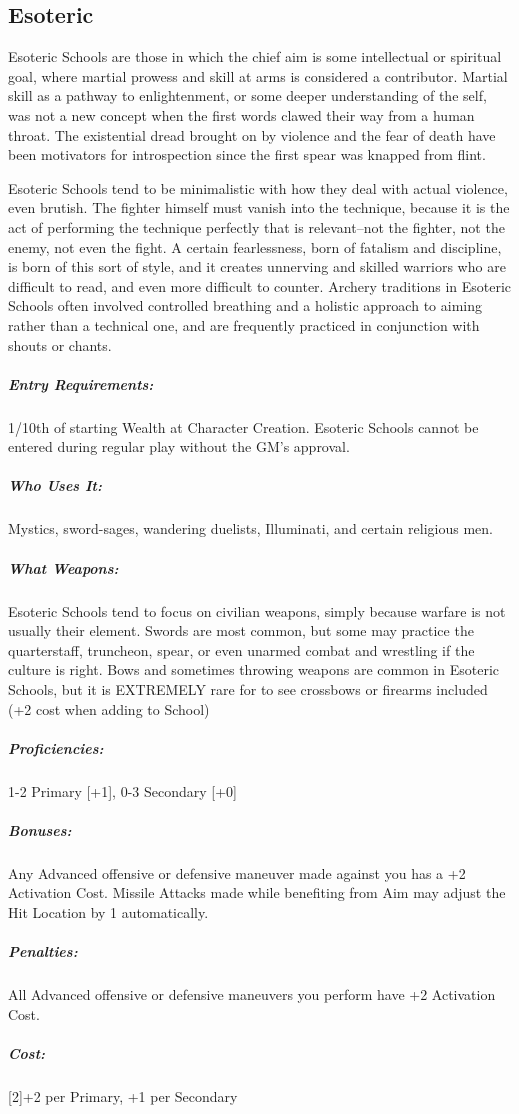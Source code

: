 \documentclass[oneside,11pt,english]{book}
\begin{document}
\subsection{Esoteric}
Esoteric Schools are those in which the chief aim is some intellectual or spiritual goal, where martial 
prowess and skill at arms is considered a contributor. Martial skill as a pathway to enlightenment, or some 
deeper understanding of the self, was not a new concept when the first words clawed their way from a 
human throat. The existential dread brought on by violence and the fear of death have been motivators for 
introspection since the first spear was knapped from flint. 

Esoteric Schools tend to be minimalistic with how they deal with actual violence, even brutish. The 
fighter himself must vanish into the technique, because it is the act of performing the technique perfectly 
that is relevant--not the fighter, not the enemy, not even the fight. A certain fearlessness, born of fatalism 
and discipline, is born of this sort of style, and it creates unnerving and skilled warriors who are difficult 
to read, and even more difficult to counter. Archery traditions in Esoteric Schools often involved 
controlled breathing and a holistic approach to aiming rather than a technical one, and are frequently 
practiced in conjunction with shouts or chants. 
\vspace{-15pt}\subparagraph{Entry Requirements:} 1/10th of starting Wealth at Character Creation. Esoteric Schools cannot be entered during regular play without the GM’s approval.
\vspace{-15pt}\subparagraph{Who Uses It:} Mystics, sword-sages, wandering duelists, Illuminati, and certain religious men. 
\vspace{-15pt}\subparagraph{What Weapons:} Esoteric Schools tend to focus on civilian weapons, simply because warfare is not 
usually their element. Swords are most common, but some may practice the quarterstaff, truncheon, spear, or even unarmed combat and wrestling if the culture is right. Bows and sometimes throwing weapons are 
common in Esoteric Schools, but it is EXTREMELY rare for to see crossbows or firearms included (+2 
cost when adding to School) 
\vspace{-15pt}\subparagraph{Proficiencies:} 1-2 Primary [+1], 0-3 Secondary [+0] 
\vspace{-15pt}\subparagraph{Bonuses:} Any Advanced offensive or defensive maneuver made against you has a +2 Activation Cost. 
Missile Attacks made while benefiting from Aim may adjust the Hit Location by 1 automatically. 
\vspace{-15pt}\subparagraph{Penalties:} All Advanced offensive or defensive maneuvers you perform have +2 Activation Cost. 
\vspace{-15pt}\subparagraph{Cost:} [2]+2 per Primary, +1 per Secondary 
\end{document}
